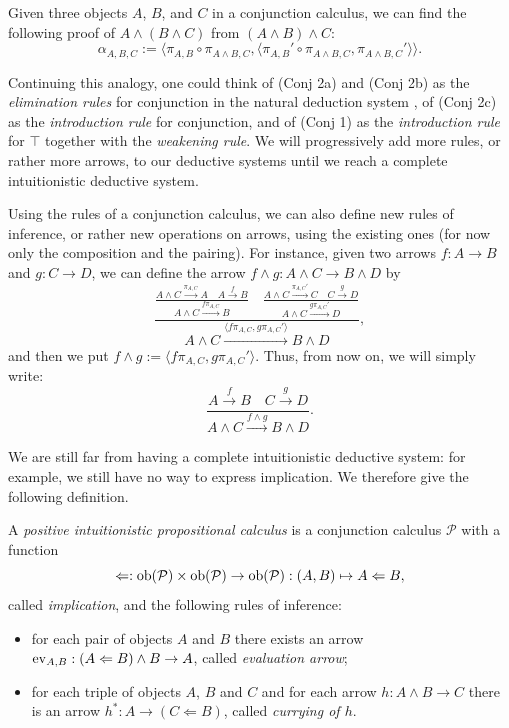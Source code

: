 \begin{example}\label{ex:associativity-of-conjunction}
    Given three objects $A$, $B$, and $C$ in a conjunction calculus, we can find the following proof of $A \land (B \land C)$ from $(A \land B) \land C$:
    \[ \alpha_{A,B,C} := \langle \pi_{A,B}\circ \pi_{A \land B,C}, \langle \pi_{A,B}'\circ \pi_{A \land B,C}, \pi_{A \land B,C}'\rangle\rangle. \]
\end{example}

Continuing this analogy, one could think of (Conj 2a) and (Conj 2b) as the \emph{elimination rules} for conjunction in the natural deduction system \cite{ChiswellHodgesAppendixA,Mennuni2025}, of (Conj 2c) as the \emph{introduction rule} for conjunction, and of
(Conj 1) as the \emph{introduction rule} for $\top$ together with the \emph{weakening rule}. We will progressively add more rules, or rather more arrows, to our deductive systems until we reach a complete intuitionistic deductive system.

\begin{remark}
    Using the rules of a conjunction calculus, we can also define new rules of inference, or rather new operations on arrows, using the existing ones (for now only the composition and the pairing).
    For instance, given two arrows $f : A \to B$ and $g : C \to D$, we can define the arrow $f \wedge g : A \wedge C \to B \wedge D$ by
    \[ \frac{\frac{A \wedge C \xrightarrow{\pi_{A,C}} A \quad A \xrightarrow{f} B}{A \wedge C \xrightarrow{f\pi_{A,C}} B} \quad \frac{A \wedge C \xrightarrow{\pi_{A,C}'} C \quad C \xrightarrow{g} D}{A \wedge C \xrightarrow{g\pi_{A,C}'} D}}{A \wedge C \xrightarrow{\langle f\pi_{A,C},g\pi_{A,C}'\rangle} B \wedge D}, \]
    and then we put $f \wedge g := \langle f\pi_{A,C},g\pi_{A,C}'\rangle$. Thus, from now on, we will simply write:
    \[ \frac{A \xrightarrow{f} B \quad C \xrightarrow{g} D}{A \wedge C \xrightarrow{f \wedge g} B \wedge D}. \]
\end{remark}

We are still far from having a complete intuitionistic deductive system: for example, we still have no way to express implication. We therefore give the following definition.

\begin{definition}\label{idx:implication}
    A \emph{positive intuitionistic propositional calculus} is a conjunction calculus $\mathcal P$ with a function
    \[ \Leftarrow : \operatorname{ob}(\mathcal P)\times\operatorname{ob}(\mathcal P) \to \operatorname{ob}(\mathcal P) : (A,B) \mapsto A \Leftarrow B, \]
    called \emph{implication}, and the following rules of inference:
    \begin{itemize}
        \item[(\textnormal{Impl 1})] for each pair of objects $A$ and $B$ there exists an arrow $\operatorname{ev}_{A,B} : (A \Leftarrow B) \wedge B \to A$, called \emph{evaluation arrow};
        \item[(\textnormal{Impl 2})] for each triple of objects $A$, $B$ and $C$ and for each arrow $h : A \wedge B \to C$ there is an arrow $h^* : A \to (C \Leftarrow B)$, called \emph{currying of $h$}.
    \end{itemize}
\end{definition}

